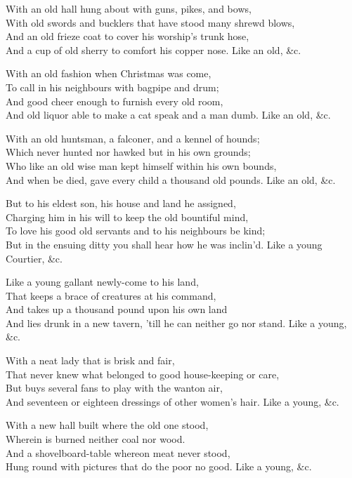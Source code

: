\begin{dcverse}\footnotesizerr
With an old hall hung about with guns, pikes, and bows,	\\
With old swords and bucklers that have stood many shrewd blows,\\
And an old frieze coat to cover his worship’s trunk hose,\\
And a cup of old sherry to comfort his copper nose. Like an old, \&c.

With an old fashion when Christmas was come,\\
To call in his neighbours with bagpipe and drum;\\
And good cheer enough to furnish every old room,\\
And old liquor able to make a cat speak and a man dumb. Like an old, \&c.

With an old huntsman, a falconer, and a kennel of hounds;	\\
Which never hunted nor hawked but in his own grounds;\\
Who like an old wise man kept himself within his own bounds,\\
And when be died, gave every child a thousand old pounds. Like an old, \&c.

But to his eldest son, his house and land he assigned,\\
Charging him in his will to keep the old bountiful mind,\\
To love his good old servants and to his neighbours be kind;\\
But in the ensuing ditty you shall hear how he was inclin’d. Like a young Courtier, \&c.

Like a young gallant newly-come to his land,\\
That keeps a brace of creatures at his command,\\
And takes up a thousand pound upon his own land\\
And lies drunk in a new tavern, ’till he can neither go nor stand. Like a young, \&c.

With a neat lady that is brisk and fair,\\
That never knew what belonged to good house-keeping or care,\\
But buys several fans to play with the wanton air,\\
And seventeen or eighteen dressings of other women’s hair. Like a young, \&c.

With a new hall built where the old one stood,\\
Wherein is burned neither coal nor wood.\\
And a shovelboard-table whereon meat never stood,\\
Hung round with pictures that do the poor no good. Like a young, \&c.


\end{dcverse}

